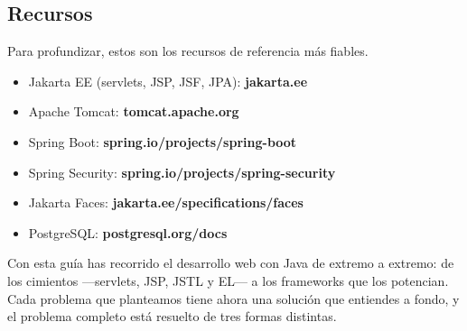 \documentclass[11pt]{article}
\begin{document}
\subsection{Recursos}
Para profundizar, estos son los recursos de referencia más fiables.

\begin{itemize}[leftmargin=1.4em,itemsep=2pt,topsep=2pt]
\item Jakarta EE (servlets, JSP, JSF, JPA): \textbf{jakarta.ee}
\item Apache Tomcat: \textbf{tomcat.apache.org}
\item Spring Boot: \textbf{spring.io/projects/spring-boot}
\item Spring Security: \textbf{spring.io/projects/spring-security}
\item Jakarta Faces: \textbf{jakarta.ee/specifications/faces}
\item PostgreSQL: \textbf{postgresql.org/docs}
\end{itemize}
Con esta guía has recorrido el desarrollo web con Java de extremo a extremo: de los cimientos —servlets, JSP, JSTL y EL— a los frameworks que los potencian. Cada problema que planteamos tiene ahora una solución que entiendes a fondo, y el problema completo está resuelto de tres formas distintas.
\end{document}
